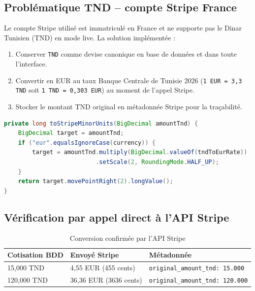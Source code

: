 \documentclass[11pt,a4paper]{article}
\begin{document}
\subsection{Problématique TND -- compte Stripe France}

Le compte Stripe utilisé est immatriculé en France et ne supporte pas le Dinar Tunisien (TND) en mode live. La solution implémentée :

\begin{enumerate}[leftmargin=*]
  \item Conserver \texttt{TND} comme devise canonique en base de données et dans toute l'interface.
  \item Convertir en EUR au taux Banque Centrale de Tunisie 2026 (\texttt{1 EUR = 3{,}3 TND} soit \texttt{1 TND = 0{,}303 EUR}) au moment de l'appel Stripe.
  \item Stocker le montant TND original en métadonnée Stripe pour la traçabilité.
\end{enumerate}

\begin{lstlisting}[language=Java, caption={Méthode de conversion dans \texttt{StripeService.java}}]
private long toStripeMinorUnits(BigDecimal amountTnd) {
    BigDecimal target = amountTnd;
    if ("eur".equalsIgnoreCase(currency)) {
        target = amountTnd.multiply(BigDecimal.valueOf(tndToEurRate))
                          .setScale(2, RoundingMode.HALF_UP);
    }
    return target.movePointRight(2).longValue();
}
\end{lstlisting}

\subsection{Vérification par appel direct à l'API Stripe}

\begin{table}[h]
  \centering
  \small
  \begin{tabularx}{\linewidth}{Xll}
    \toprule
    \textbf{Cotisation BDD} & \textbf{Envoyé Stripe} & \textbf{Métadonnée} \\
    \midrule
    15{,}000 TND   & 4{,}55 EUR (455 cents) & \texttt{original\_amount\_tnd: 15.000} \\
    120{,}000 TND  & 36{,}36 EUR (3636 cents) & \texttt{original\_amount\_tnd: 120.000} \\
    \bottomrule
  \end{tabularx}
  \caption{Conversion confirmée par l'API Stripe}
\end{table}
\end{document}
